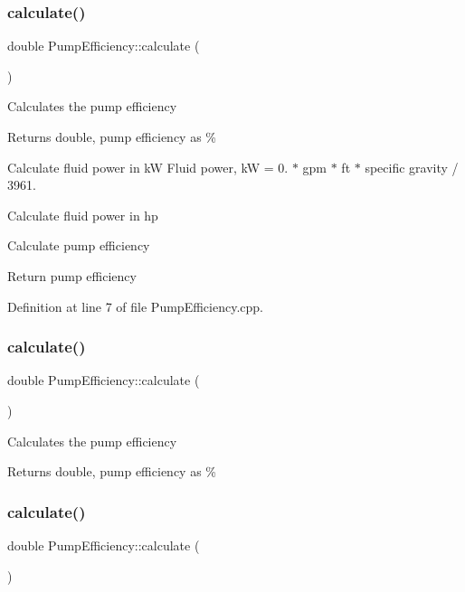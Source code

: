 \subsubsection{\texorpdfstring{calculate()}{calculate()}\hspace{0.1cm}{\footnotesize\ttfamily [1/3]}}
{\footnotesize\ttfamily double Pump\+Efficiency\+::calculate (\begin{DoxyParamCaption}{ }\end{DoxyParamCaption})}

Calculates the pump efficiency

\begin{DoxyReturn}{Returns}
double, pump efficiency as \% 
\end{DoxyReturn}
Calculate fluid power in kW Fluid power, kW = 0. $\ast$ gpm $\ast$ ft $\ast$ specific gravity / 3961.

Calculate fluid power in hp

Calculate pump efficiency

Return pump efficiency

Definition at line 7 of file Pump\+Efficiency.\+cpp.

\mbox{\label{class_pump_efficiency_ab45de46019ff182d4f11810b2791a8c9}} 
\subsubsection{\texorpdfstring{calculate()}{calculate()}\hspace{0.1cm}{\footnotesize\ttfamily [2/3]}}
{\footnotesize\ttfamily double Pump\+Efficiency\+::calculate (\begin{DoxyParamCaption}{ }\end{DoxyParamCaption})}

Calculates the pump efficiency

\begin{DoxyReturn}{Returns}
double, pump efficiency as \% 
\end{DoxyReturn}
\mbox{\label{class_pump_efficiency_ab45de46019ff182d4f11810b2791a8c9}} 
\subsubsection{\texorpdfstring{calculate()}{calculate()}\hspace{0.1cm}{\footnotesize\ttfamily [3/3]}}
{\footnotesize\ttfamily double Pump\+Efficiency\+::calculate (\begin{DoxyParamCaption}{ }\end{DoxyParamCaption})}

